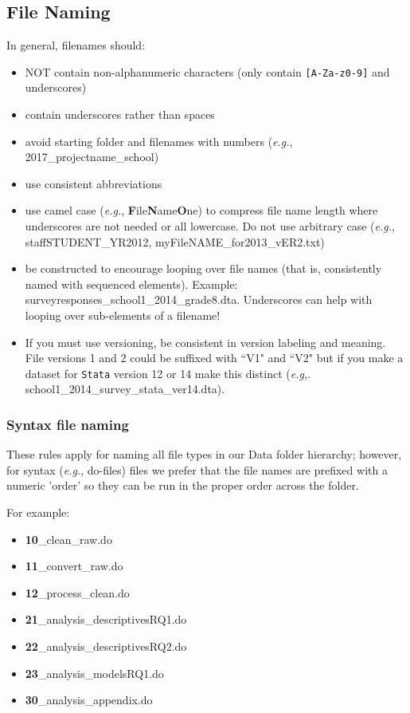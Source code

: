 \subsection{File Naming}
In general, filenames should:
\begin{itemize}
	\item NOT contain non-alphanumeric characters (only contain \texttt{[A-Za-z0-9]} and underscores)
	\item contain underscores rather than spaces
	\item avoid starting folder and filenames with numbers (\textit{e.g.},  2017\_projectname\_school)
	\item use consistent abbreviations
	\item use camel case ({\it{e.g.}}, \textbf{F}ile\textbf{N}ame\textbf{O}ne) to compress file name length where underscores are not needed or all lowercase. Do not use arbitrary case (\textit{e.g.},  staffSTUDENT\_YR2012, myFileNAME\_for2013\_vER2.txt)
	\item be constructed to encourage looping over file names (that is, consistently named with sequenced elements). Example:  surveyresponses\_school1\_2014\_grade8.dta.   Underscores can help with looping over sub-elements of a filename!
	\item If you must use versioning, be consistent in version labeling and meaning.  File versions 1 and 2 could be suffixed with ``V1" and ``V2" but if you make a dataset for \texttt{Stata} version 12 or 14 make this distinct (\textit{e.g,}. school1\_2014\_survey\_stata\_ver14.dta).
	\end{itemize}

\subsubsection{Syntax file naming}
These rules apply for naming all file types in our Data folder hierarchy; however, for syntax ({\it{e.g.}}, do-files) files we prefer that the file names are prefixed with a numeric 'order' so they can be run in the proper order across the folder.

For example:
\linespread{1}
\begin{itemize}[label=]
	\item   \textbf{10}\_clean\_raw.do
	\item   \textbf{11}\_convert\_raw.do
	\item   \textbf{12}\_process\_clean.do
	\item   \textbf{21}\_analysis\_descriptivesRQ1.do
	\item   \textbf{22}\_analysis\_descriptivesRQ2.do
	\item   \textbf{23}\_analysis\_modelsRQ1.do
	\item   \textbf{30}\_analysis\_appendix.do
\end{itemize}
\linespread{1.25}

